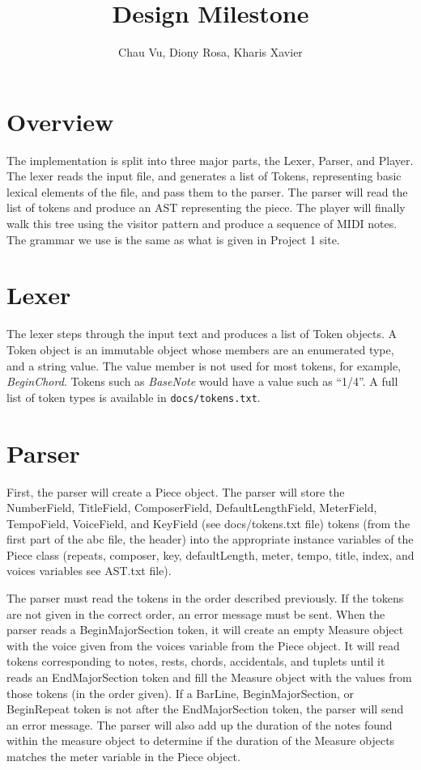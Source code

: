 \documentclass{article}
\title{Design Milestone}
\author{Chau Vu, Diony Rosa, Kharis Xavier}
\begin{document}
\maketitle

\section{Overview}
The implementation is split into three major parts, the Lexer, Parser, and Player.
The lexer reads the input file, and generates a list of Tokens, representing basic lexical elements of the file,
and pass them to the parser.
The parser will read the list of tokens and produce an AST representing the piece.
The player will finally walk this tree using the visitor pattern and produce a sequence of MIDI notes.
The grammar we use is the same as what is given in Project 1 site.

\section{Lexer}
The lexer steps through the input text and produces a list of Token objects.
A Token object is an immutable object whose members are an enumerated type, and a string value.
The value member is not used for most tokens, for example, \textit{BeginChord}.
Tokens such as \textit{BaseNote} would have a value such as ``1/4''.
A full list of token types is available in \texttt{docs/tokens.txt}.

\section{Parser}

First, the parser will create a Piece object.
The parser will store the NumberField, TitleField, ComposerField, DefaultLengthField, MeterField, TempoField, VoiceField, and KeyField (see docs/tokens.txt file) tokens (from the first part of the abc file, the header) into the appropriate instance variables of the Piece class (repeats, composer, key, defaultLength, meter, tempo, title, index, and voices variables see AST.txt file).

The parser must read the tokens in the order described previously. If the tokens are not given in the correct order, an error message must be sent.
When the parser reads a BeginMajorSection token, it will create an empty Measure object with the voice given from the voices variable from the Piece object. It will read tokens corresponding to notes, rests, chords, accidentals, and tuplets until it reads an EndMajorSection token and fill the Measure object with the values from those tokens (in the order given). If a BarLine, BeginMajorSection, or BeginRepeat token is not after the EndMajorSection token, the parser will send an error message. The parser will also add up the duration of the notes found within the measure object to determine if the duration of the Measure objects matches the meter variable in the Piece object.
\end{document}
